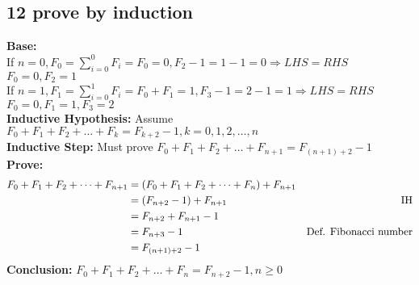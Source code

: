 \documentclass[a4paper]{article}
\begin{document}
\subsection{12 prove by induction}
\textbf{Base:} \\
If $n=0, F_0=\sum_{i=0}^0 F_i=F_0=0, F_2-1=1-1=0\Rightarrow LHS=RHS$ \hfill $F_0=0, F_2=1$\\
If $n=1, F_1=\sum_{i=0}^1 F_i=F_0+F_1=1, F_3-1=2-1=1\Rightarrow LHS=RHS$ \hfill $F_0=0, F_1=1,F_3=2$\\
\textbf{Inductive Hypothesis:} Assume $F_0+F_1+F_2+\dots+F_k=F_{k+2}-1,k=0,1,2,\dots,n$\\
\textbf{Inductive Step:} Must prove $F_0+F_1+F_2+\dots+F_{n+1}=F_{(n+1)+2}-1$\\
\textbf{Prove:}\\
\begin{align*}
    F_0+F_1+F_2+\dots+F_{n+1} & = (F_0+F_1+F_2+\dots+F_n)+F_{n+1}\\
    & = (F_{n+2}-1)+F_{n+1} & \hfill \text{IH} \\
    & = F_{n+2}+F_{n+1}-1 & \hfill \text{} \\
    & = F_{n+3}-1 & \hfill \text{Def. Fibonacci number} \\
    & = F_{(n+1)+2}-1 & \hfill \text{} \\
\end{align*}
\textbf{Conclusion: }$F_0+F_1+F_2+\dots+F_n=F_{n+2}-1,n\ge0 $
\end{document}
